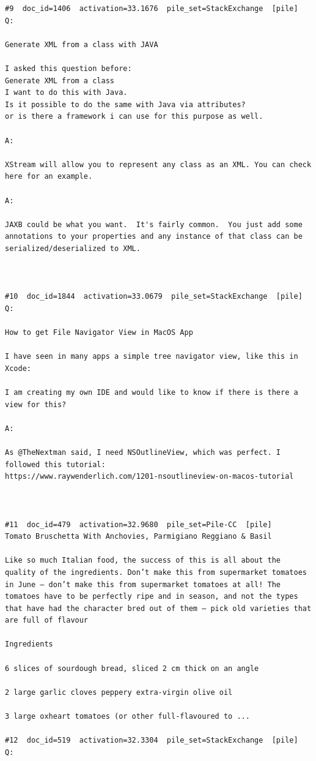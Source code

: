 \begin{verbatim}
#9  doc_id=1406  activation=33.1676  pile_set=StackExchange  [pile]
Q:

Generate XML from a class with JAVA

I asked this question before:
Generate XML from a class
I want to do this with Java.
Is it possible to do the same with Java via attributes?
or is there a framework i can use for this purpose as well.

A:

XStream will allow you to represent any class as an XML. You can check here for an example.

A:

JAXB could be what you want.  It's fairly common.  You just add some annotations to your properties and any instance of that class can be serialized/deserialized to XML.



#10  doc_id=1844  activation=33.0679  pile_set=StackExchange  [pile]
Q:

How to get File Navigator View in MacOS App

I have seen in many apps a simple tree navigator view, like this in Xcode:

I am creating my own IDE and would like to know if there is there a view for this?

A:

As @TheNextman said, I need NSOutlineView, which was perfect. I followed this tutorial:
https://www.raywenderlich.com/1201-nsoutlineview-on-macos-tutorial



#11  doc_id=479  activation=32.9680  pile_set=Pile-CC  [pile]
Tomato Bruschetta With Anchovies, Parmigiano Reggiano & Basil

Like so much Italian food, the success of this is all about the quality of the ingredients. Don’t make this from supermarket tomatoes in June – don’t make this from supermarket tomatoes at all! The tomatoes have to be perfectly ripe and in season, and not the types that have had the character bred out of them – pick old varieties that are full of flavour

Ingredients

6 slices of sourdough bread, sliced 2 cm thick on an angle

2 large garlic cloves peppery extra-virgin olive oil

3 large oxheart tomatoes (or other full-flavoured to ...

#12  doc_id=519  activation=32.3304  pile_set=StackExchange  [pile]
Q:


\end{verbatim}
